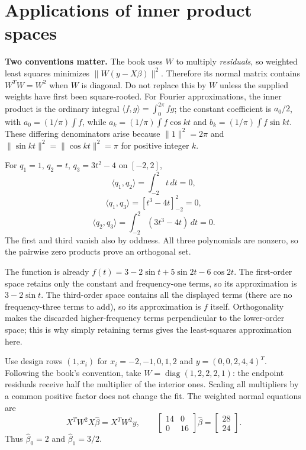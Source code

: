 \section{Applications of inner product spaces}
\textbf{Two conventions matter.} The book uses $W$ to multiply
\emph{residuals}, so weighted least squares minimizes
$\|W(y-X\beta)\|^2$. Therefore its normal matrix contains
$W^TW=W^2$ when $W$ is diagonal. Do not replace this by $W$
unless the supplied weights have first been square-rooted.
For Fourier approximations, the inner product is the ordinary integral
$\langle f,g\rangle=\int_0^{2\pi}fg$; the constant coefficient is
$a_0/2$, with $a_0=(1/\pi)\int f$, while
$a_k=(1/\pi)\int f\cos kt$ and $b_k=(1/\pi)\int f\sin kt$.
These differing denominators arise because $\|1\|^2=2\pi$ and
$\|\sin kt\|^2=\|\cos kt\|^2=\pi$ for positive integer $k$.

For $q_1=1$, $q_2=t$, $q_3=3t^2-4$ on $[-2,2]$,
\[
 \langle q_1,q_2\rangle=\int_{-2}^2t\,dt=0,
\]
\[
 \langle q_1,q_3\rangle=[t^3-4t]_{-2}^2=0,
\]
\[
 \langle q_2,q_3\rangle=\int_{-2}^2(3t^3-4t)\,dt=0.
\]
The first and third vanish also by oddness. All three polynomials
are nonzero, so the pairwise zero products prove an orthogonal set.

The function is already
$f(t)=3-2\sin t+5\sin2t-6\cos2t$.
The first-order space retains only the constant and frequency-one
terms, so its approximation is $3-2\sin t$.
The third-order space contains all the displayed terms (there are no
frequency-three terms to add), so its approximation is $f$ itself.
Orthogonality makes the discarded higher-frequency terms perpendicular
to the lower-order space; this is why simply retaining terms gives
the least-squares approximation here.

Use design rows $(1,x_i)$ for $x_i=-2,-1,0,1,2$ and
$y=(0,0,2,4,4)^T$. Following the book's convention, take
$W=\operatorname{diag}(1,2,2,2,1)$: the endpoint residuals receive
half the multiplier of the interior ones. Scaling all multipliers
by a common positive factor does not change the fit.
The weighted normal equations are
\[
 X^TW^2X\widehat\beta=X^TW^2y,
 \qquad
 \begin{bmatrix}14&0\\0&16\end{bmatrix}\widehat\beta
 =\begin{bmatrix}28\\24\end{bmatrix}.
\]
Thus $\widehat\beta_0=2$ and $\widehat\beta_1=3/2$.

